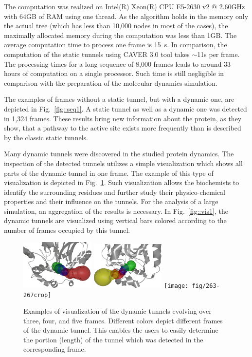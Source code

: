 \documentclass[usletter, 10pt, conference]{svjour3}      %
\begin{document}
The computation was realized on Intel(R) Xeon(R) CPU E5-2630 v2 @ 2.60GHz with 64GB of RAM using one thread.
As the algorithm holds in the memory only the actual tree (which has less than 10,000 nodes in most of the cases),
the maximally allocated memory during the computation was less than 1GB.
The average computation time to process one frame is 15~s.
In comparison, the computation of the static tunnels using CAVER 3.0 tool takes $\sim$11s per frame.
The processing times for a long sequence of 8,000 frames leads to around 33 hours of computation on a single processor.
Such time is still negligible in comparison with the preparation of the molecular dynamics simulation.

The examples of frames without a static tunnel, but with a dynamic one, are depicted in Fig.~\ref{fig::seq1}.
A static tunnel as well as a dynamic one was detected in 1,324 frames.
These results bring new information about the protein, as they show, that a pathway to the active site exists more
frequently than is described by the classic static tunnels.



Many dynamic tunnels were discovered in the studied protein dynamics.
The inspection of the detected tunnels utilizes a simple visualization which shows all parts of the dynamic tunnel in one frame.
The example of this type of visualization is depicted in Fig.~\ref{fig::joint}.
Such visualization allows the biochemists to identify the surrounding residues and further study their physico-chemical properties and their influence on the tunnels.
For the analysis of a large simulation, an aggregation of the results is necessary.
In Fig.~\ref{fig::vis1}, the dynamic tunnels are visualized using vertical bars colored according to the number of frames occupied by this tunnel.


   
    
\begin{figure}
\centering
\includegraphics[width=0.33\textwidth]{fig/58-60crop}
\includegraphics[width=0.33\textwidth]{fig/280-283crop}
\texttt{[image: fig/263-267crop]}
\caption{\label{fig::joint}
Examples of visualization of the dynamic tunnels evolving over three, four, and five frames. Different colors depict different frames of the dynamic tunnel. This enables the users to easily determine the portion (length) of the tunnel which was detected in the corresponding frame. 
}
\end{figure}
\end{document}
